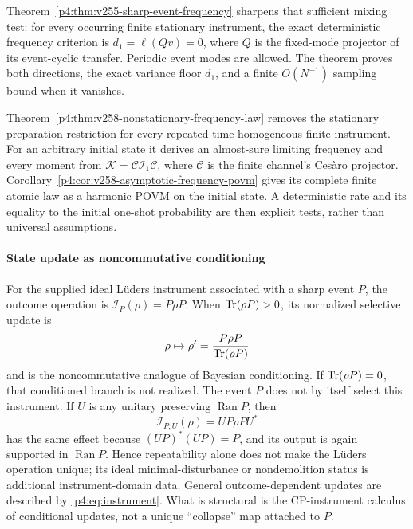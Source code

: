 \documentclass[12pt,a4paper]{article}
\begin{document}
Theorem~\ref{p4:thm:v255-sharp-event-frequency} sharpens that sufficient
mixing test: for every occurring finite stationary instrument, the exact
deterministic frequency criterion is $d_1=\ell(Qv)=0$, where $Q$ is the
fixed-mode projector of its event-cyclic transfer. Periodic event modes
are allowed. The theorem proves both directions, the exact variance
floor $d_1$, and a finite $O(N^{-1})$ sampling bound when it vanishes.

Theorem~\ref{p4:thm:v258-nonstationary-frequency-law} removes the stationary
preparation restriction for every repeated time-homogeneous finite instrument.
For an arbitrary initial state it derives an almost-sure limiting frequency
and every moment from $\mathcal K=\mathcal C\mathcal I_1\mathcal C$,
where $\mathcal C$ is the finite channel's Ces\`aro projector.
Corollary~\ref{p4:cor:v258-asymptotic-frequency-povm} gives its complete
finite atomic law as a harmonic POVM on the initial state. A deterministic
rate and its equality to the initial one-shot probability are then explicit
tests, rather than universal assumptions.

\paragraph{State update as noncommutative conditioning}
\label{p4:sec:part2-conditioning}

For the supplied ideal L\"uders instrument associated with a sharp event
\(P\), the outcome operation is
\(\mathcal I_P(\rho)=P\rho P\).  When \(\operatorname{Tr}(\rho P)>0\), its normalized
selective update is
\begin{equation}
\label{p4:eq:luders}
\rho\mapsto \rho'=\frac{P\rho P}{\operatorname{Tr}(\rho P)}
\end{equation}
and is the noncommutative analogue of Bayesian conditioning.  If
\(\operatorname{Tr}(\rho P)=0\), that conditioned branch is not realized.  The event \(P\)
does not by itself select this instrument.  If \(U\) is any unitary preserving
\(\operatorname{Ran}P\), then
\[
\mathcal I_{P,U}(\rho)=UP\rho PU^*
\]
has the same effect because \((UP)^*(UP)=P\), and its output is again supported
in \(\operatorname{Ran}P\).  Hence repeatability alone does not make the
L\"uders operation unique; its ideal minimal-disturbance or nondemolition
status is additional instrument-domain data.  General outcome-dependent
updates are described by \eqref{p4:eq:instrument}.  What is structural is the
CP-instrument calculus of conditional updates, not a unique ``collapse'' map
attached to \(P\).
\end{document}
